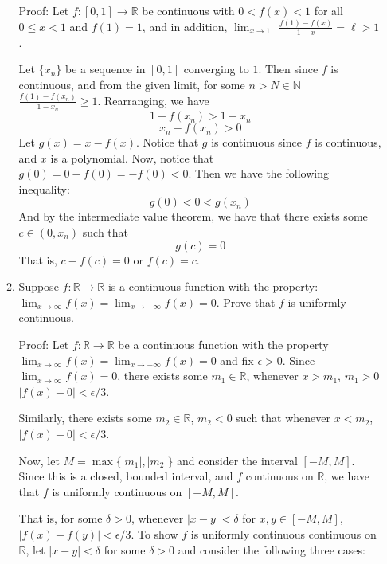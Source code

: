 \documentclass{article}
\begin{document}
\begin{enumerate}
\begin{enumerate}
        Proof: Let $f: [0,1] \to \mathbb{R}$ be continuous with $0 < f(x) < 1$ for all $0 \leq x < 1$ and $f(1) = 1$, and in addition, $\lim_{x \to 1^{-}} \frac{f(1) - f(x)}{1 - x} = \ell > 1$. 
        
        Let $\{x_n\}$ be a sequence in $[0,1]$ converging to $1$. Then since $f$ is continuous, and from the given limit, for some $n > N \in \mathbb{N}$ $\frac{f(1) - f(x_n)}{1 - x_n} \geq 1$. Rearranging, we have 
        \[1 - f(x_n) > 1 - x_n\]
        \[x_n - f(x_n) > 0\]
        Let $g(x) = x - f(x)$. Notice that $g$ is continuous since $f$ is continuous, and $x$ is a polynomial. Now, notice that $g(0) = 0 - f(0) = -f(0) < 0$.
        Then we have the following inequality:
        \[g(0) < 0 < g(x_n)\]
        And by the intermediate value theorem, we have that there exists some $c \in (0,x_n)$ such that 
        \[g(c) = 0\]
        That is, $c - f(c) = 0$ or $f(c) = c$.
        
        
        \item Suppose $f: \mathbb{R} \to \mathbb{R}$ is a continuous function with the property: $\lim_{x \to \infty} f(x) = \lim_{x \to -\infty} f(x) = 0$. Prove that $f$ is uniformly continuous.
        \newline
        
        Proof: Let $f: \mathbb{R} \to \mathbb{R}$ be a continuous function with the property $\lim_{x \to \infty} f(x) = \lim_{x \to -\infty} f(x) = 0$ and fix $\epsilon > 0$. 
        Since $\lim_{x \to \infty} f(x) = 0$, there exists some $m_1 \in \mathbb{R}$, whenever $x > m_1$, $m_1 > 0$ $|f(x) - 0| < \epsilon/3$. 
        \newline
    
        Similarly, there exists some $m_2 \in \mathbb{R}$, $m_2 < 0$ such that whenever $x < m_2$, $|f(x) - 0| < \epsilon/3$.
        
        Now, let $M = \max{\{|m_1|, |m_2|\}}$ and consider the interval $[-M, M]$. Since this is a closed, bounded interval, and $f$ continuous on $\mathbb{R}$, we have that $f$ is uniformly continuous on $[-M,M]$.  
        \newline
        
        That is, for some $\delta > 0$, whenever $|x - y| < \delta$ for $x,y \in [-M, M]$, $|f(x) - f(y)| < \epsilon/3$. 
        To show $f$ is uniformly continuous continuous on $\mathbb{R}$, let $|x - y| < \delta$ for some $\delta > 0$ and consider the following three cases:
        \newline
        

\end{enumerate}
\end{enumerate}
\end{document}

